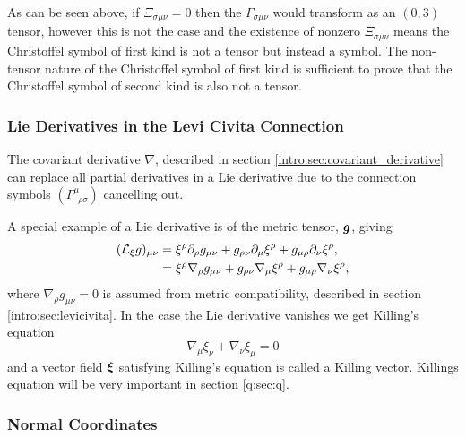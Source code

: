 As can be seen above, if $\Xi_{\sigma\mu\nu}=0$ then the $\Gamma_{\sigma\mu\nu}$ would transform as an $(0,3)$ tensor, however this is not the case and the existence of nonzero $\Xi_{\sigma\mu\nu}$ means the Christoffel symbol of first kind is not a tensor but instead a symbol. The non-tensor nature of the Christoffel symbol of first kind is sufficient to prove that the Christoffel symbol of second kind is also not a tensor.


\subsubsection{Lie Derivatives in the Levi Civita Connection}

The covariant derivative $\nabla$, described in section \ref{intro:sec:covariant_derivative} can replace all partial derivatives in a Lie derivative due to the connection symbols $\left( \Gamma^\mu_{\,\,\,\rho\sigma}\right)$ cancelling out.

A special example of a Lie derivative is of the metric tensor, $\boldsymbol{g}$, giving
\begin{align}
(\mathcal{L}_\xi g)_{\mu\nu} &= \xi^\rho \partial_\rho g_{\mu\nu} + g_{\rho\nu}\partial_\mu \xi^\rho + g_{\mu\rho}\partial_\nu \xi^\rho, \\
&= \xi^\rho {\nabla_\rho g_{\mu\nu}} + g_{\rho\nu}\nabla_\mu \xi^\rho  + g_{\mu\rho}\nabla_\nu \xi^\rho, 
\end{align}
where $\nabla_\rho g_{\mu\nu}=0$ is assumed from metric compatibility, described in section \ref{intro:sec:levicivita}. In the case the Lie derivative vanishes we get Killing's equation
\begin{equation}
\nabla_{\mu}\xi_\nu + \nabla_\nu \xi_\mu =0
\end{equation} 
and a vector field $\boldsymbol\xi$ satisfying Killing's equation is called a Killing vector. Killings equation will be very important in section \ref{q:sec:q}.

\subsubsection{Normal Coordinates} \label{intro:sec:normal_coords}

